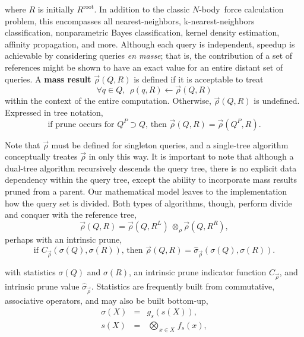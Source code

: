 \documentclass[twoside,leqno,twocolumn]{article}
\newcommand{\summary}{\hat{\sigma}}
\newcommand{\defterm}[1]{{\bf #1}}
\newcommand{\nbody}{$N$-body}
\newcommand{\kdroot}[1]{#1^{\text{root}}}
\newcommand{\kdleft}[1]{#1^{\!L}}
\newcommand{\kdright}[1]{#1^{\!R}}
\newcommand{\kdparent}[1]{#1^{\!P}}
\newcommand{\nameOp}[2]{\mathop{#1\nolimits\!\!_{#2}}}
\newcommand{\nameop}[2]{{\scriptstyle\:}#1_{\!#2}}
\newcommand{\myOp}[1]{\nameOp{\bigotimes}{#1}}
\newcommand{\myop}[1]{\nameop{\otimes}{#1}}
\newcommand{\letterqr}{\rho}
\newcommand{\inqr}{\rho}
\newcommand{\opqr}{\myop{\letterqr}}
\newcommand{\letterqrv}{\vec{\rho}}
\newcommand{\inqrv}{\vec{\rho}}
\newcommand{\deltaqrv}{\summary_{\!\letterqrv}}
\newcommand{\canpruneqrv}{C_{\!\letterqrv}}
\newcommand{\letterstat}{s}
\newcommand{\outstat}{\sigma}
\newcommand{\instat}{s}
\newcommand{\Opstat}{\myOp{\letterstat}}
\newcommand{\fstat}{f_{\!\letterstat}}
\newcommand{\gstat}{g_{\!\letterstat}}
\begin{document}
\noindent where $R$ is initially $\kdroot{R}$.
In addition to the classic \nbody\ force calculation problem, this encompasses all nearest-neighbors, k-nearest-neighbors classification, nonparametric Bayes classification, kernel density estimation, affinity propagation, and more.
Although each query is independent, speedup is achievable by considering queries {\it en masse}; that is, the contribution of a set of references might be shown to have an exact value for an entire distant set of queries.
A \defterm{mass result} $\inqrv(Q, R)$ is defined if it is acceptable to treat
\[
\forall q \in Q,~~ \inqr(q, R) \gets \inqrv(Q, R)
\]
\noindent
within the context of the entire computation.
Otherwise, $\inqrv(Q,R)$ is undefined.
Expressed in tree notation,
\begin{equation}
\text{if prune occurs for } \kdparent{Q} \supset Q \text{, then } \inqrv(Q, R) = \inqrv(\kdparent{Q}, R).
\label{eqn:qrvparent}
\end{equation}

\noindent
Note that $\inqrv$ must be defined for singleton queries, and a single-tree algorithm conceptually treates $\inqrv$ in only this way.
It is important to note that although a dual-tree algorithm recursively descends the query tree, there is no explicit data dependency within the query tree, except the ability to incorporate mass results pruned from a parent.
Our mathematical model leaves to the implementation how the query set is divided.
Both types of algorithms, though, perform divide and conquer with the reference tree,
\begin{equation}
\inqrv(Q, R) = \inqrv(Q, \kdleft{R}) \opqr \inqrv(Q, \kdright{R}),
\label{eqn:qrvcompose}
\end{equation}
\noindent perhaps with an intrinsic prune,
\begin{equation}
\text{if } \canpruneqrv(\outstat(Q), \outstat(R)) \text{, then } \inqrv(Q, R) = \deltaqrv(\outstat(Q), \outstat(R)).
\label{eqn:qrvprune}
\end{equation}

\noindent
with statistics $\outstat(Q)$ and $\outstat(R)$, an intrinsic prune indicator function $\canpruneqrv$, and intrinsic prune value $\deltaqrv$.
Statistics are frequently built from commutative, associative operators, and may also be built bottom-up,
\begin{eqnarray}
\outstat(X) &=& \gstat(\instat(X)),
\\
\instat(X) &=& \Opstat_{x \in X} \fstat(x),
\label{eqn:defstat}
\end{eqnarray}
\end{document}
